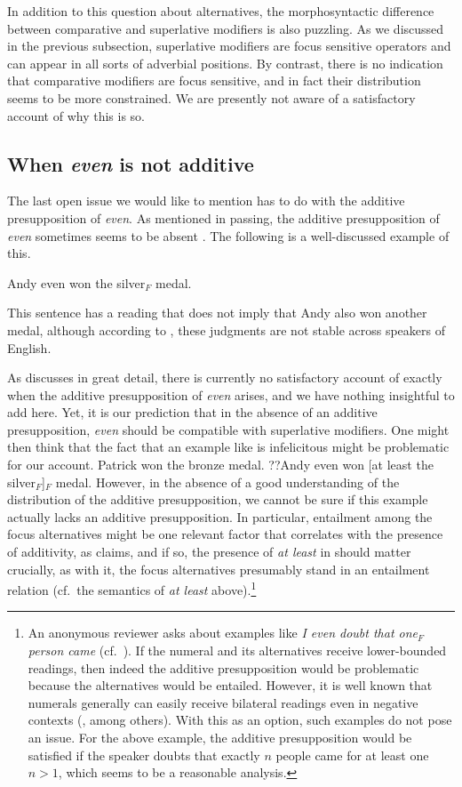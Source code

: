 \documentclass[output=paper]{langscibook}
\begin{document}
In addition to this question about alternatives, the morphosyntactic difference between comparative and superlative modifiers is also puzzling. As we discussed in the previous subsection, superlative modifiers are focus sensitive operators and can appear in all sorts of adverbial positions. By contrast, there is no indication that comparative modifiers are focus sensitive, and in fact their distribution seems to be more constrained. We are presently not aware of a satisfactory account of why this is so.


\subsection{When \textit{even} is not additive}

The last open issue we would like to mention has to do with the additive presupposition of \textit{even}. As mentioned in passing, the additive presupposition of \textit{even} sometimes seems to be absent \citep{rullmann, crnic}. The following is a well-discussed example of this.

\ea Andy even won the silver$_F$ medal.\label{don-sud:silver}\z

\noindent This sentence has a reading that does not imply that Andy also won another medal, although according to \citet{francis}, these judgments are not stable across speakers of English.

As \citet{crnic} discusses in great detail, there is currently no satisfactory account of exactly when the additive presupposition of \textit{even} arises, and we have nothing insightful to add here. Yet, it is our prediction that in the absence of an additive presupposition, \textit{even} should be compatible with superlative modifiers. One might then think that the fact that an example like  is infelicitous might be problematic for our account.
\ea Patrick won the bronze medal. ??Andy even won [at least the silver$_F$]$_F$ medal.\label{don-sud:evensilver}\z
However, in the absence of a good understanding of the distribution of the additive presupposition, we cannot be sure if this example actually lacks an additive presupposition. In particular, entailment among the focus alternatives might be one relevant factor that correlates with the presence of additivity, as \citet{crnic} claims, and if so, the presence of \textit{at least} in  should matter crucially, as with it, the focus alternatives presumably stand in an entailment relation (cf.\ the semantics of \textit{at least} above).\footnote{An anonymous reviewer asks about examples like \textit{I even doubt that one$_F$ person came} (cf.\ \citealt{crnic}). If the numeral and its alternatives receive lower-bounded readings, then indeed the additive presupposition would be problematic because the alternatives would be entailed. However, it is well known that numerals generally can easily receive bilateral readings even in negative contexts (\citealt{geurts, breheny}, among others). With this as an option, such examples do not pose an issue. For the above example, the additive presupposition would be satisfied if the speaker doubts that exactly $n$ people came for at least one $n>1$, which seems to be a reasonable analysis.}
\end{document}
